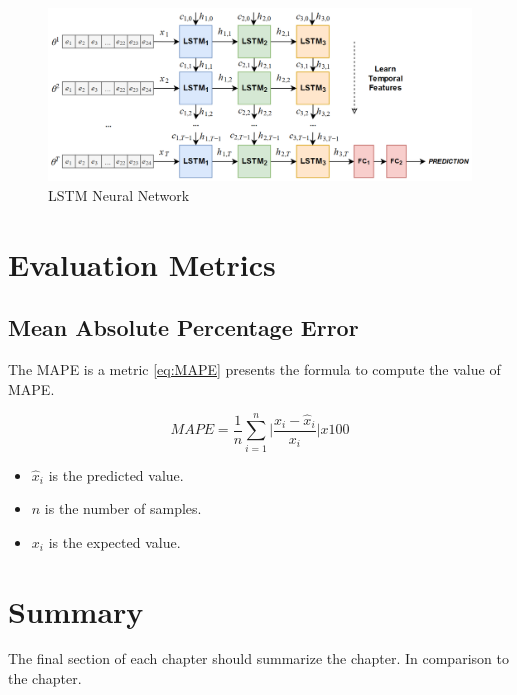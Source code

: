 \begin{figure}[h]
\centering
\includegraphics[width=\linewidth]{figures/Ch2/LSTM_nn.png}
\caption{LSTM Neural Network \cite{zapata2019}}
\label{f:LSTM-nn}
\end{figure}



\section{Evaluation Metrics}
\label{sec:section_Example}

\subsection{Mean Absolute Percentage Error}
The \ac{MAPE} is a metric 
\autoref{eq:MAPE} presents the formula to compute the value of \ac{MAPE}.

\begin{equation}\label{eq:MAPE}
    MAPE = \frac{1}{n} \sum_{i=1}^{n} \bigg| \frac{x_i - \hat{x}_i}{x_i} \bigg| x 100
\end{equation}

\begin{itemize}
    \item \begin{math}\hat{x}_i\end{math} is the predicted value.
    \item \begin{math}n\end{math} is the number of samples.
    \item \begin{math}x_i\end{math} is the expected value.
\end{itemize}


\section{Summary}
\label{s:Background-Summary}

The final section of each chapter should summarize the chapter. In comparison to the chapter.

